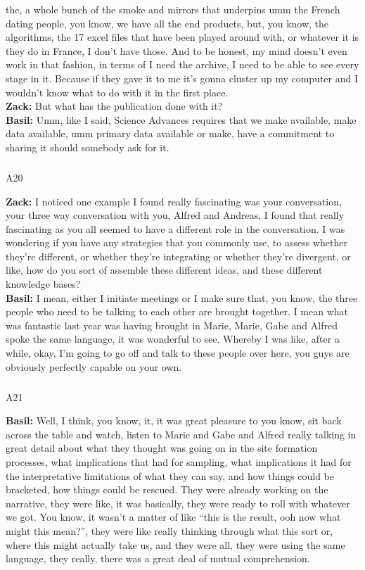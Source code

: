 \documentclass[
  canadian,
]{article}
\makeatletter
\let\oldsubparagraph\subparagraph
\renewcommand{\subparagraph}{
    \@ifstar
      \xxxSubParagraphStar
      \xxxSubParagraphNoStar
  }
\newcommand{\xxxSubParagraphStar}[1]{\oldsubparagraph*{#1}\mbox{}}
\newcommand{\xxxSubParagraphNoStar}[1]{\oldsubparagraph{#1}\mbox{}}
\makeatother
\begin{document}
the, a whole bunch of the smoke and mirrors that underpins umm the
French dating people, you know, we have all the end products, but, you
know, the algorithms, the 17 excel files that have been played around
with, or whatever it is they do in France, I don't have those. And to be
honest, my mind doesn't even work in that fashion, in terms of I need
the archive, I need to be able to see every stage in it. Because if they
gave it to me it's gonna cluster up my computer and I wouldn't know what
to do with it in the first place.\\
\textbf{Zack:} But what has the publication done with it?\\
\textbf{Basil:} Umm, like I said, Science Advances requires that we make
available, make data available, umm primary data available or make, have
a commitment to sharing it should somebody ask for it.

\subparagraph{A20}\label{sec-A20}

\textbf{Zack:} I noticed one example I found really fascinating was your
conversation, your three way conversation with you, Alfred and Andreas,
I found that really fascinating as you all seemed to have a different
role in the conversation. I was wondering if you have any strategies
that you commonly use, to assess whether they're different, or whether
they're integrating or whether they're divergent, or like, how do you
sort of assemble these different ideas, and these different knowledge
bases?\\
\textbf{Basil:} I mean, either I initiate meetings or I make sure that,
you know, the three people who need to be talking to each other are
brought together. I mean what was fantastic last year was having brought
in Marie, Marie, Gabe and Alfred spoke the same language, it was
wonderful to see. Whereby I was like, after a while, okay, I'm going to
go off and talk to these people over here, you guys are obviously
perfectly capable on your own.

\subparagraph{A21}\label{sec-A21}

\textbf{Basil:} Well, I think, you know, it, it was great pleasure to
you know, sit back across the table and watch, listen to Marie and Gabe
and Alfred really talking in great detail about what they thought was
going on in the site formation processes, what implications that had for
sampling, what implications it had for the interpretative limitations of
what they can say, and how things could be bracketed, how things could
be rescued. They were already working on the narrative, they were like,
it was basically, they were ready to roll with whatever we got. You
know, it wasn't a matter of like ``this is the result, ooh now what
might this mean?'', they were like really thinking through what this
sort or, where this might actually take us, and they were all, they were
using the same language, they really, there was a great deal of mutual
comprehension.
\end{document}
